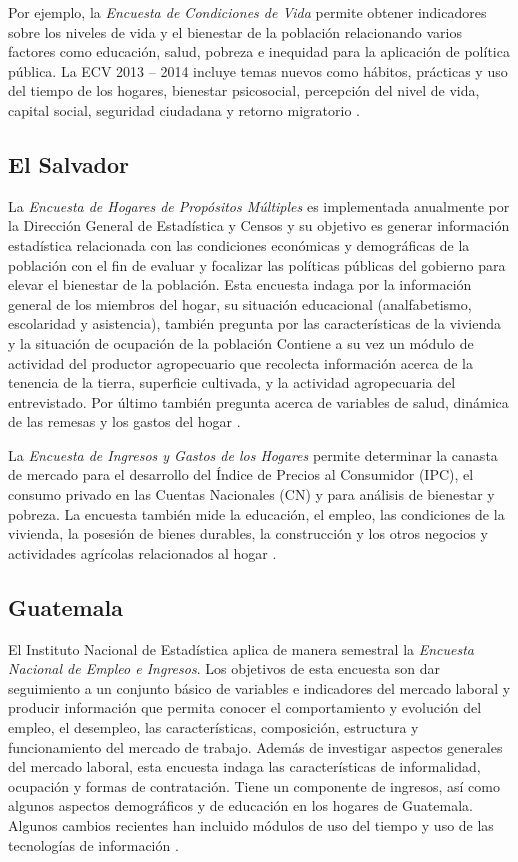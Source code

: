 \documentclass[
  12pt,
  spanish,
]{book}
\begin{document}
Por ejemplo, la \emph{Encuesta de Condiciones de Vida} permite obtener indicadores sobre los niveles de vida y el bienestar de la población relacionando varios factores como educación, salud, pobreza e inequidad para la aplicación de política pública. La ECV 2013 -- 2014 incluye temas nuevos como hábitos, prácticas y uso del tiempo de los hogares, bienestar psicosocial, percepción del nivel de vida, capital social, seguridad ciudadana y retorno migratorio \citep{INEC2-EC}.

\hypertarget{el-salvador}{%
\subsection{El Salvador}\label{el-salvador}}

La \emph{Encuesta de Hogares de Propósitos Múltiples} es implementada anualmente por la Dirección General de Estadística y Censos y su objetivo es generar información estadística relacionada con las condiciones económicas y demográficas de la población con el fin de evaluar y focalizar las políticas públicas del gobierno para elevar el bienestar de la población. Esta encuesta indaga por la información general de los miembros del hogar, su situación educacional (analfabetismo, escolaridad y asistencia), también pregunta por las características de la vivienda y la situación de ocupación de la población Contiene a su vez un módulo de actividad del productor agropecuario que recolecta información acerca de la tenencia de la tierra, superficie cultivada, y la actividad agropecuaria del entrevistado. Por último también pregunta acerca de variables de salud, dinámica de las remesas y los gastos del hogar \citep{DIGESTYC-SV}.

La \emph{Encuesta de Ingresos y Gastos de los Hogares} permite determinar la canasta de mercado para el desarrollo del Índice de Precios al Consumidor (IPC), el consumo privado en las Cuentas Nacionales (CN) y para análisis de bienestar y pobreza. La encuesta también mide la educación, el empleo, las condiciones de la vivienda, la posesión de bienes durables, la construcción y los otros negocios y actividades agrícolas relacionados al hogar \citep{DIGESTYC2-SV}.

\hypertarget{guatemala}{%
\subsection{Guatemala}\label{guatemala}}

El Instituto Nacional de Estadística aplica de manera semestral la \emph{Encuesta Nacional de Empleo e Ingresos}. Los objetivos de esta encuesta son dar seguimiento a un conjunto básico de variables e indicadores del mercado laboral y producir información que permita conocer el comportamiento y evolución del empleo, el desempleo, las características, composición, estructura y funcionamiento del mercado de trabajo. Además de investigar aspectos generales del mercado laboral, esta encuesta indaga las características de informalidad, ocupación y formas de contratación. Tiene un componente de ingresos, así como algunos aspectos demográficos y de educación en los hogares de Guatemala. Algunos cambios recientes han incluido módulos de uso del tiempo y uso de las tecnologías de información \citep{INE-GT}.
\end{document}

